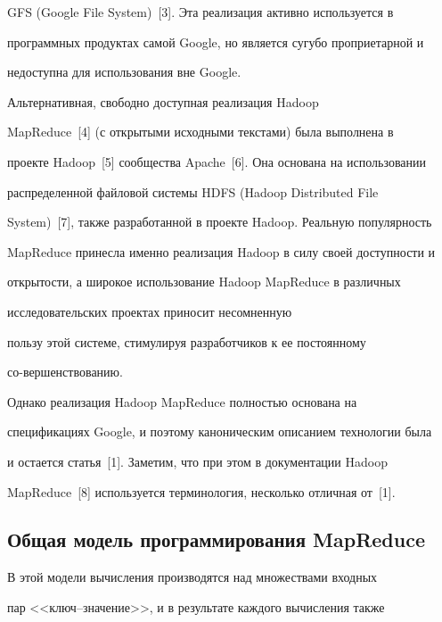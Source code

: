 GFS (Google File System)~[3]. Эта реализация активно используется в 


программных продуктах самой Google, но является сугубо проприетарной и 


недоступна для использования вне Google. 


      


      Альтернативная, свободно доступная реализация Hadoop 


MapReduce~[4] (с открытыми исходными текстами) была выполнена в 


проекте Hadoop~[5] сообщества Apache~[6]. Она основана на использовании 


распределенной файловой системы HDFS (Hadoop Distributed File 


System)~[7], также разработанной в проекте Hadoop. Реальную популярность 


MapReduce принесла именно реализация Hadoop в силу своей доступности и 


открытости, а широкое использование Hadoop MapReduce в различных 


исследовательских проектах приносит не\-со\-мнен\-ную 


пользу этой системе, стимулируя разработчиков к ее постоянному 


со-\linebreak вер\-шен\-ст\-вованию. 


      


      Однако реализация Hadoop MapReduce полностью основана на 


спецификациях Google, и поэтому каноническим описанием технологии была 


и остается статья~[1]. Заметим, что при этом в документации Hadoop 


MapReduce~[8] используется терминология, несколько отличная от~[1]. 





\subsection{Общая модель программирования MapReduce}





      В этой модели вычисления производятся над множествами входных 


пар <<ключ--зна\-че\-ние>>, и в результате каждого вычисления также 


